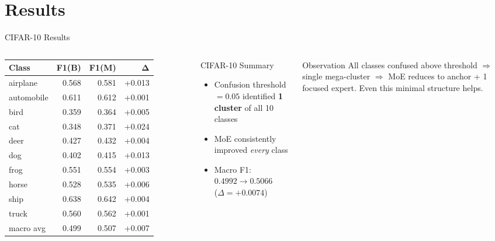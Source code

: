 \documentclass[aspectratio=169,10pt]{beamer}
\newcommand{\good}[1]{\cellcolor{good}#1}
\newcommand{\neu}[1]{\cellcolor{neutral}#1}
\begin{document}
\section{Results}

\begin{frame}{CIFAR-10 Results}
  \begin{columns}[T]
      \footnotesize
      \renewcommand{\arraystretch}{1.2}
      \begin{tabular}{lrrr}
        \toprule
        \textbf{Class} & \textbf{F1(B)} & \textbf{F1(M)} & $\boldsymbol{\Delta}$ \\
        \midrule
        airplane   & 0.568 & \good{0.581} & \good{+0.013} \\
        automobile & 0.611 & \good{0.612} & \neu{+0.001}  \\
        bird       & 0.359 & \good{0.364} & \good{+0.005} \\
        cat        & 0.348 & \good{0.371} & \good{+0.024} \\
        deer       & 0.427 & \good{0.432} & \good{+0.004} \\
        dog        & 0.402 & \good{0.415} & \good{+0.013} \\
        frog       & 0.551 & \good{0.554} & \good{+0.003} \\
        horse      & 0.528 & \good{0.535} & \good{+0.006} \\
        ship       & 0.638 & \good{0.642} & \good{+0.004} \\
        truck      & 0.560 & \good{0.562} & \neu{+0.001}  \\
        \midrule
        macro avg  & 0.499 & \good{0.507} & \good{+0.007} \\
        \bottomrule
      \end{tabular}

      \begin{block}{CIFAR-10 Summary}
        \small
        \begin{itemize}\itemsep4pt
          \item Confusion threshold $= 0.05$ identified \textbf{1 cluster} of all 10 classes
          \item MoE consistently improved \emph{every} class
          \item Macro F1: $0.4992 \to 0.5066$ \\ ($\Delta = +0.0074$)
        \end{itemize}
      \end{block}
      \vspace{6pt}
      \begin{alertblock}{Observation}
        \small
        All classes confused above threshold $\Rightarrow$ single mega-cluster
        $\Rightarrow$ MoE reduces to anchor + 1 focused expert.
        Even this minimal structure helps.
      \end{alertblock}
  \end{columns}
\end{frame}
\end{document}
